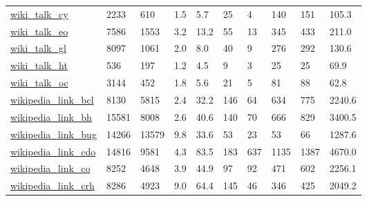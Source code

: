 \begin{longtable}{llllllllll}
 \href{http://konect.cc/networks/wiki_talk_ar}{wiki\_talk\_cy}                                                                & 2233       & 610   & 1.5    & 5.7    & 25    & 4      & 140    & 151    & 105.3   \\
 \href{http://konect.cc/networks/wiki_talk_ar}{wiki\_talk\_eo}                                                                & 7586       & 1553  & 3.2    & 13.2   & 55    & 13     & 345    & 433    & 211.0   \\
 \href{http://konect.cc/networks/wiki_talk_ar}{wiki\_talk\_gl}                                                                & 8097       & 1061  & 2.0    & 8.0    & 40    & 9      & 276    & 292    & 130.6   \\
 \href{http://konect.cc/networks/wiki_talk_ar}{wiki\_talk\_ht}                                                                & 536        & 197   & 1.2    & 4.5    & 9     & 3      & 25     & 25     & 69.9    \\
 \href{http://konect.cc/networks/wiki_talk_ar}{wiki\_talk\_oc}                                                                & 3144       & 452   & 1.8    & 5.6    & 21    & 5      & 81     & 88     & 62.8    \\
 \href{http://konect.cc/networks/wikipedia_link_en}{wikipedia\_link\_bcl}                                                     & 8130       & 5815  & 2.4    & 32.2   & 146   & 64     & 634    & 775    & 2240.6  \\
 \href{http://konect.cc/networks/wikipedia_link_en}{wikipedia\_link\_bh}                                                      & 15581      & 8008  & 2.6    & 40.6   & 140   & 70     & 666    & 829    & 3400.5  \\
 \href{http://konect.cc/networks/wikipedia_link_en}{wikipedia\_link\_bug}                                                     & 14266      & 13579 & 9.8    & 33.6   & 53    & 23     & 53     & 66     & 1287.6  \\
 \href{http://konect.cc/networks/wikipedia_link_en}{wikipedia\_link\_cdo}                                                     & 14816      & 9581  & 4.3    & 83.5   & 183   & 637    & 1135   & 1387   & 4670.0  \\
 \href{http://konect.cc/networks/wikipedia_link_en}{wikipedia\_link\_co}                                                      & 8252       & 4648  & 3.9    & 44.9   & 97    & 92     & 471    & 602    & 2256.1  \\
 \href{http://konect.cc/networks/wikipedia_link_en}{wikipedia\_link\_crh}                                                     & 8286       & 4923  & 9.0    & 64.4   & 145   & 46     & 346    & 425    & 2049.2  \\

\end{longtable}
